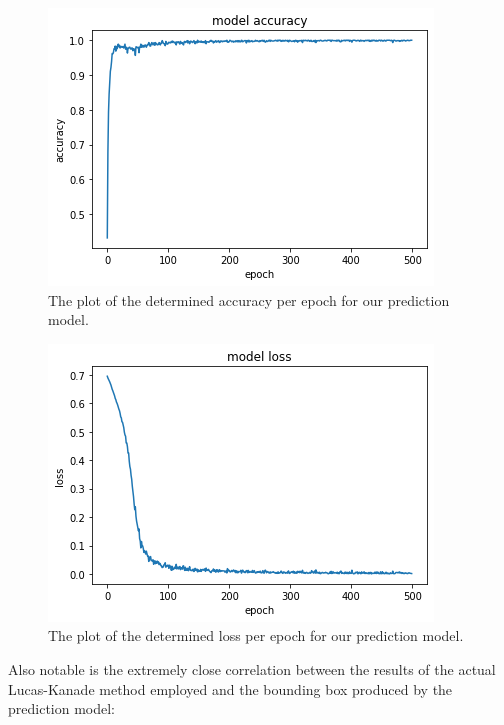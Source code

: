 \documentclass[]{article}
\begin{document}
    \begin{figure}[H]
        \centering
        \includegraphics[width=\textwidth]{output_23_0.png}
        \caption{The plot of the determined accuracy per epoch for our prediction model.}
        \label{fig:accuracy}
    \end{figure}

    \begin{figure}[H]
        \centering
        \includegraphics[width=\textwidth]{output_25_0.png}
        \caption{The plot of the determined loss per epoch for our prediction model.}
        \label{fig:loss}
    \end{figure}

    Also notable is the extremely close correlation between the results of the actual Lucas-Kanade method employed and the bounding box produced by the prediction model:
\end{document}

